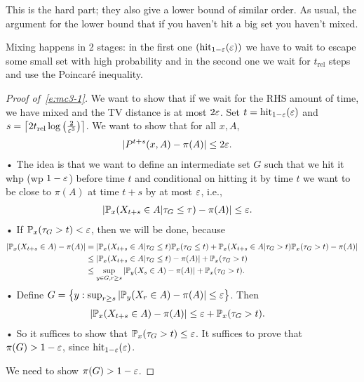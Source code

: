 This is the hard part; they also give a lower bound of similar order. As usual, the argument for the lower bound that if you haven't hit a big set you haven't mixed.

\begin{rem}
Mixing happens in 2 stages: in the first one $(\text{hit}_{1-\varepsilon}(\varepsilon))$ we have to wait to escape some small set with high probability and in the second one we wait for $t_{\text{rel}}$ steps and use the Poincar\'e inequality.
\end{rem}

\begin{proof}[Proof of~\eqref{e:mc3-1}]
We want to show that if we wait for the RHS amount of time, we have mixed and the TV distance is at most $2\varepsilon$. Set $t=\text{hit}_{1-\varepsilon}(\varepsilon)$ and $s=\left\lceil {2t_{\text{rel}}\log\left( {\frac{2}{\varepsilon^3}} \right)}\right\rceil$. We want to show that for all $x,A$,
\begin{align*}
|P^{t+s}(x,A) - \pi(A)|&\le 2\varepsilon.
\end{align*}•
The idea is that we want to define an intermediate set $G$ such that we hit it whp (wp $1-\varepsilon$) before time $t$ and conditional on hitting it by time $t$ we want to be close to $\pi(A)$ at time $t+s$ by at most $\varepsilon$, i.e., 
\begin{align*}
|\mathbb{P}_x(X_{t+s}\in A|\tau_G\le \tau)-\pi(A)|&\le \varepsilon.
\end{align*}•
If $\mathbb{P}_x(\tau_G>t)<\varepsilon$, then we will be done, because 
\begin{align*}
|\mathbb{P}_x(X_{t+s}\in A)-\pi(A)|
&= |\mathbb{P}_x(X_{t+s}\in A|\tau_G\le t)\mathbb{P}_x(\tau_G\le t)
+ \mathbb{P}_x(X_{t+s}\in A|\tau_G> t)\mathbb{P}_x(\tau_G>t)-\pi(A)|\\
&\le |\mathbb{P}_x(X_{t+s}\in A|\tau_G\le t)-\pi(A)| + \mathbb{P}_x(\tau_G>t)\\
&\le \sup_{y\in G,r\ge s} |\mathbb{P}_y(X_s\in A)- \pi(A)| + \mathbb{P}_x(\tau_G>t).
\end{align*}•
Define $G=\left\{{y}:{\sup_{r\ge s} |\mathbb{P}_y(X_r\in A)-\pi(A)|\le \varepsilon}\right\}$. Then 
\begin{align*}
|\mathbb{P}_x(X_{t+s}\in A)-\pi(A)| &\le \varepsilon + \mathbb{P}_x(\tau_G>t).
\end{align*}•
So it suffices to show that $\mathbb{P}_x(\tau_G>t)\le \varepsilon$. 
It suffices to prove that $\pi(G)>1-\varepsilon$, since $\text{hit}_{1-\varepsilon}(\varepsilon)$. 

We need to show $\pi(G)>1-\varepsilon$. 


\end{proof}
